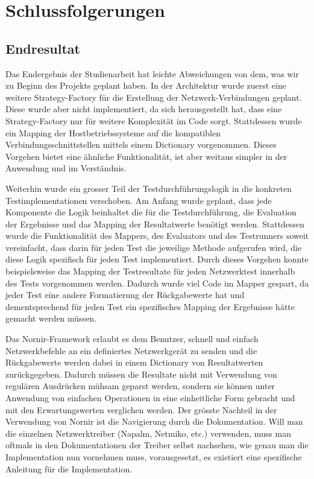 \documentclass[]{subfiles}
\begin{document}
\section{Schlussfolgerungen}
\subsection{Endresultat}
Das Endergebnis der Studienarbeit hat leichte Abweichungen von dem, was wir zu Beginn
des Projekts geplant haben. 
In der Architektur wurde zuerst eine weitere Strategy-Factory für die Erstellung 
der Netzwerk-Verbindungen geplant. Diese wurde aber nicht implementiert, da 
sich herausgestellt hat, dass eine Strategy-Factory nur für weitere Komplexität 
im Code sorgt. 
Stattdessen wurde ein Mapping der Hostbetriebssysteme auf die 
kompatiblen Verbindungsschnittstellen mittels einem Dictionary vorgenommen.
Dieses Vorgehen bietet eine ähnliche Funktionalität, ist aber weitaus simpler 
in der Anwendung und im Verständnis.

Weiterhin wurde ein grosser Teil der Testdurchführungslogik in die konkreten Testimplementationen
verschoben. 
Am Anfang wurde geplant, dass jede Komponente die Logik beinhaltet die für die Testdurchführung,
die Evaluation der Ergebnisse und das Mapping der Resultatwerte benötigt werden.
Stattdessen wurde die Funktionalität des Mappers, des Evaluators und des Testrunners soweit 
vereinfacht, dass darin für jeden Test die jeweilige Methode aufgerufen wird, die diese
Logik spezifisch für jeden Test implementiert.
Durch dieses Vorgehen konnte beispielsweise das Mapping der Testresultate für jeden 
Netzwerktest innerhalb des Tests vorgenommen werden. 
Dadurch wurde viel Code im Mapper gespart, da jeder Test eine andere Formatierung der 
Rückgabewerte hat und dementsprechend für jeden Test ein spezifisches Mapping der Ergebnisse
hätte gemacht werden müssen.

Das Nornir-Framework erlaubt es dem Benutzer, schnell und einfach Netzwerkbefehle an ein
definiertes Netzwerkgerät zu senden und die Rückgabewerte werden dabei in einem 
Dictionary von Resultatwerten zurückgegeben. 
Dadurch müssen die Resultate nicht mit Verwendung von regulären Ausdrücken mühsam 
geparst werden, sondern sie können unter Anwendung von einfachen Operationen 
in eine einheitliche Form gebracht und mit den Erwartungswerten verglichen werden.
Der grösste Nachteil in der Verwendung von Nornir ist die Navigierung durch die Dokumentation.
Will man die einzelnen Netzwerktreiber (Napalm, Netmiko, etc.) verwenden, muss man 
oftmals in den Dokumentationen der Treiber selbst nachsehen, wie genau man die
Implementation nun vornehmen muss, vorausgesetzt, es existiert eine spezifische Anleitung
für die Implementation. 
\end{document}
